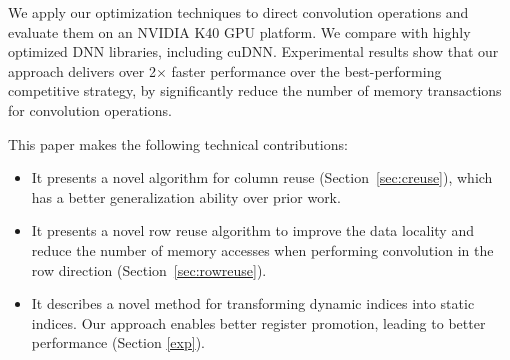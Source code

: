 
We apply our optimization techniques to direct convolution operations and evaluate them on an NVIDIA K40 GPU platform.
We compare with highly optimized DNN libraries, including cuDNN. Experimental results show that our approach delivers
over 2$\times$ faster performance over the best-performing competitive strategy, by significantly reduce the number of
memory transactions for convolution operations.

This paper makes the following technical contributions:
\begin{itemize}
  \item It presents a novel algorithm for column reuse (Section~\ref{sec:creuse}), which has a better generalization
      ability over prior work.
  \item It presents a novel row reuse algorithm to improve the data locality and reduce the number of memory accesses
      when performing convolution in the row direction (Section~\ref {sec:rowreuse}).
  \item It describes a novel method for transforming dynamic indices into static indices. Our approach enables better
      register promotion, leading to better performance (Section \ref{exp}).
\end{itemize}
